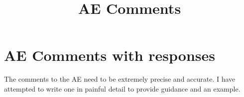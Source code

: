 \documentclass{article}
\begin{document}
\title{AE Comments}
\author{}
\date{}
\maketitle



\section{AE Comments with responses}

The comments to the AE need to be extremely precise and accurate. I have attempted to write one in painful detail to provide guidance and an example.
\end{document}
